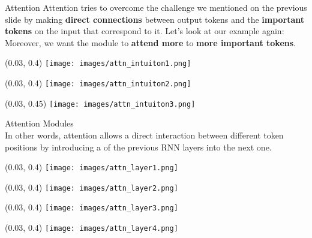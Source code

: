 \documentclass[UKenglish]{beamer}
\begin{document}
\begin{frame}{Attention}
Attention tries to overcome the challenge we mentioned on the previous slide by making \textbf{direct connections} between output tokens and the \textbf{important tokens} on the input that correspond to it.  {Let's look at our example again:}
 {Moreover, we want the module to \textbf{attend more} to \textbf{more important tokens}.}
 {
\begin{textblock}{0.15}(0.03, 0.4)
        \texttt{[image: images/attn\_intuiton1.png]}
\end{textblock}}
 {
\begin{textblock}{0.15}(0.03, 0.4)
        \texttt{[image: images/attn\_intuiton2.png]}
\end{textblock}}
 {
\begin{textblock}{0.15}(0.03, 0.45)
        \texttt{[image: images/attn\_intuiton3.png]}
\end{textblock}}
\end{frame}
\begin{frame}{Attention Modules} %
\vspace{0.3cm}\\
    In other words, attention allows a direct interaction between different token positions by introducing a  of the previous RNN layers into the next one.
 {
\begin{textblock}{0.15}(0.03, 0.4)
        \texttt{[image: images/attn\_layer1.png]}
\end{textblock}}
 {
\begin{textblock}{0.15}(0.03, 0.4)
        \texttt{[image: images/attn\_layer2.png]}
\end{textblock}}
 {
\begin{textblock}{0.15}(0.03, 0.4)
        \texttt{[image: images/attn\_layer3.png]}
\end{textblock}}
 {
\begin{textblock}{0.15}(0.03, 0.4)
        \texttt{[image: images/attn\_layer4.png]}
\end{textblock}}
\end{frame}
\end{document}
